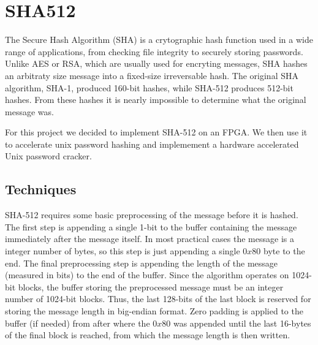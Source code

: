 \section{SHA512}
The Secure Hash Algorithm (SHA) is a crytographic hash function used in a wide range of applications, from checking
file integrity to securely storing passwords. Unlike AES or RSA, which are usually used for
encryting messages, SHA hashes an arbitraty size message into a fixed-size irreversable hash.
The original SHA algorithm, SHA-1, produced 160-bit hashes, while SHA-512
produces 512-bit hashes. From these hashes it is nearly impossible to determine
what the original message was.

For this project we decided to implement SHA-512 on an FPGA.
We then use it to accelerate unix password hashing and implemement
a hardware accelerated Unix password cracker.

\subsection{Techniques}
SHA-512 requires some basic preprocessing of the message before it is hashed. The first
step is appending a single 1-bit to the buffer containing the message immediately after the message itself.
In most practical cases the message is a integer number of bytes, so this step is just appending
a single $0x80$ byte to the end. The final preprocessing step is appending the
length of the message (measured in bits) to the end of the buffer.
Since the algorithm operates on 1024-bit blocks, the buffer storing the preprocessed message
must be an integer number of 1024-bit blocks. Thus, the last 128-bits of the last block
is reserved for storing the message length in big-endian format. Zero padding is
applied to the buffer (if needed) from after where the $0x80$ was appended until the last 16-bytes
of the final block is reached, from which the message length is then written.


